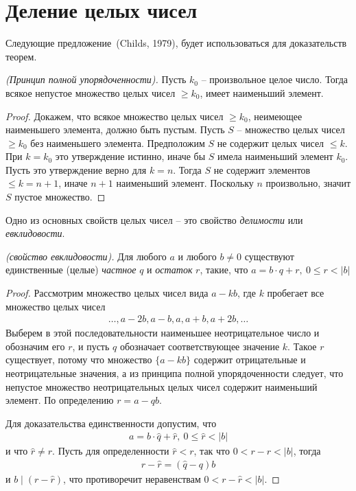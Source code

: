 \documentclass[14pt]{extreport}
\begin{document}
\section{Деление целых чисел}

Следующие предложение~(Childs, 1979), будет использоваться для
доказательств теорем.
\begin{proposition} \emph{(Принцип полной упорядоченности).}
Пусть $k_0$ -- произвольное целое число. Тогда всякое непустое множество
целых чисел $ \geq k_0$, имеет наименьший элемент.
\end{proposition}
\begin{proof}
Докажем, что всякое множество целых чисел $ \geq k_0$, неимеющее
наименьшего элемента, должно быть пустым. Пусть $S$ -- множество
целых чисел $ \geq k_0$  без наименьшего элемента. Предположим
$S$ не содержит целых чисел $ \leq k$. При $k = k_0$ это утверждение
истинно, иначе бы $S$ имела наименьший элемент $k_0$. Пусть это
утверждение верно для $k = n$. Тогда $S$ не содержит элементов
$ \leq k = n+1$, иначе $n+1$ наименьший элемент. Поскольку $n$
произвольно, значит $S$ пустое множество.
\end{proof}

Одно из основных свойств целых чисел -- это свойство \emph{делимости}
или \emph{евклидовости}.
\begin{theorem}\emph{(свойство евклидовости).}
Для любого $a$ и любого $b \neq 0$ существуют единственные (целые)
\emph{частное} $q$ и \emph{остаток} $r$, такие, что
$a=b\cdot q + r, \ 0 \leq r < |b|$
\end{theorem}
\begin{proof}
Рассмотрим множество целых чисел вида $a-kb$, где $k$ пробегает все множество
целых чисел
\begin{eqnarray*}
 \ldots, a -2b, a-b , a, a+b, a+2b,  \ldots
\end{eqnarray*}
Выберем в этой последовательности наименьшее неотрицательное
число и обозначим его $r$, и пусть $q$ обозначает соответствующее
значение $k$. Такое $r$ существует, потому что множество $\{ a-kb\}$
содержит отрицательные и неотрицательные значения, а из принципа полной
упорядоченности следует, что непустое множество неотрицательных целых
чисел содержит наименьший элемент. По определению $r=a - qb$.

Для доказательства единственности допустим, что
\begin{eqnarray*}
a=b\cdot \hat q + \hat r, \ 0 \leq \hat r < |b|
\end{eqnarray*}
и что $\hat r \neq r$. Пусть для определенности $\hat r < r$, так что
$0 < r - \hat r < |b|$, тогда
\begin{eqnarray*}
  r - \hat r = (\hat q - q)b
\end{eqnarray*}
и $b \mid (r - \hat r)$, что противоречит неравенствам
$0 < r - \hat r < |b|$.
\end{proof}
\end{document}
